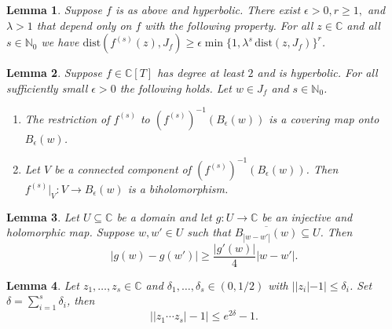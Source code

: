 \documentclass[10pt,a4paper]{amsart}
\newtheorem{lemma}{Lemma}
\newcommand{\IC}{\mathbb{C}}
\newcommand{\IN}{\mathbb{N}}
\renewcommand{\subset}{\subseteq}
\begin{document}
\begin{lemma}
  \label{lem:hyperbolic2}
  Suppose $f$ is as above and hyperbolic.  
  There exist $\epsilon>0,r\ge 1,$ and $\lambda>1$ that depend
  only on $f$ with the following property. For all $z\in\IC$ and all
  $s\in\IN_0$ we have $\mathrm{dist}(f^{(s)}(z),J_f) \ge \epsilon
  \min\{1,\lambda^s\, \mathrm{dist}(z,J_f)\}^r$.
\end{lemma}

\begin{lemma}
  \label{lem:hyperboliccovering}  
  Suppose $f\in\IC[T]$ has degree at least $2$ and is hyperbolic.
  For all sufficiently small $\epsilon > 0$ the following holds.
  Let $w\in J_f$ and $s\in\IN_0$.
  \begin{enumerate}
  \item [(i)]
    The restriction of $f^{(s)}$ to $(f^{(s)})^{-1}(B_\epsilon(w))$ is a
    covering map onto $B_\epsilon(w)$. 
  \item[(ii)] Let $V$ be a connected component of
    $(f^{(s)})^{-1}(B_\epsilon(w))$. Then $f^{(s)}|_V\colon
    V\rightarrow B_\epsilon(w)$ is a biholomorphism.
  \end{enumerate}
\end{lemma}

\begin{lemma}
  \label{lem:koebequarterapp}
  Let $U\subset\IC$ be a domain and let $g\colon U\rightarrow\IC$ be
  an injective and holomorphic map. Suppose $w,w'\in U$  such that
  $\overline{B_{|w-w'|}(w)}\subset U$. Then
  \begin{equation*}
    |g(w)-g(w')|\ge \frac{|g'(w)|}{4}|w-w'|.
  \end{equation*}
\end{lemma}

\begin{lemma}
  \label{lem:elementary}
  Let $z_1,\ldots,z_s\in\IC$ and $\delta_1,\ldots,\delta_s \in (0,1/2)$
  with $||z_i|-1|\le \delta_i$. Set
  $\delta=\sum_{i=1}^s\delta_i$, then 
  \begin{equation*}
    \bigl||z_1\cdots z_s|-1\bigr| \le e^{2\delta}-1.
  \end{equation*}  
\end{lemma}
\end{document}
